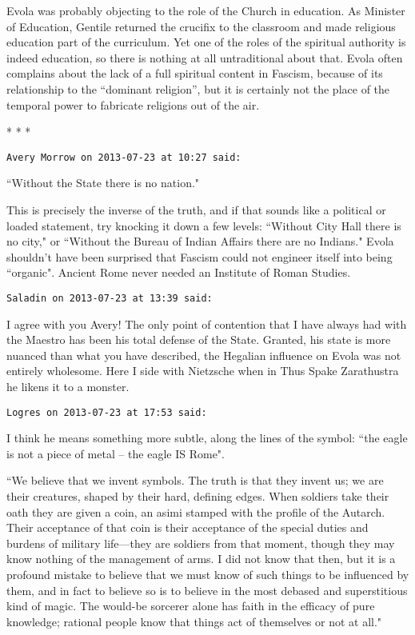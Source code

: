 Evola was probably objecting to the role of the Church in education. As Minister of Education, Gentile returned the crucifix to the classroom and made religious education part of the curriculum. Yet one of the roles of the spiritual authority is indeed education, so there is nothing at all untraditional about that. Evola often complains about the lack of a full spiritual content in Fascism, because of its relationship to the “dominant religion”, but it is certainly not the place of the temporal power to fabricate religions out of the air.


\begin{center}* * *\end{center}

\begin{footnotesize}\begin{sffamily}



\texttt{Avery Morrow on 2013-07-23 at 10:27 said: }

``Without the State there is no nation."

This is precisely the inverse of the truth, and if that sounds like a political or loaded statement, try knocking it down a few levels: ``Without City Hall there is no city," or ``Without the Bureau of Indian Affairs there are no Indians." Evola shouldn't have been surprised that Fascism could not engineer itself into being ``organic". Ancient Rome never needed an Institute of Roman Studies.


\hfill

\texttt{Saladin on 2013-07-23 at 13:39 said: }

I agree with you Avery! The only point of contention that I have always had with the Maestro has been his total defense of the State. Granted, his state is more nuanced than what you have described, the Hegalian influence on Evola was not entirely wholesome. Here I side with Nietzsche when in Thus Spake Zarathustra he likens it to a monster.


\hfill

\texttt{Logres on 2013-07-23 at 17:53 said: }

I think he means something more subtle, along the lines of the symbol: ``the eagle is not a piece of metal – the eagle IS Rome". 

``We believe that we invent symbols. The truth is that they invent us; we are their creatures, shaped by their hard, defining edges. When soldiers take their oath they are given a coin, an asimi stamped with the profile of the Autarch. Their acceptance of that coin is their acceptance of the special duties and burdens of military life—they are soldiers from that moment, though they may know nothing of the management of arms. I did not know that then, but it is a profound mistake to believe that we must know of such things to be influenced by them, and in fact to believe so is to believe in the most debased and superstitious kind of magic. The would-be sorcerer alone has faith in the efficacy of pure knowledge; rational people know that things act of themselves or not at all."


\end{sffamily}
\end{footnotesize}
